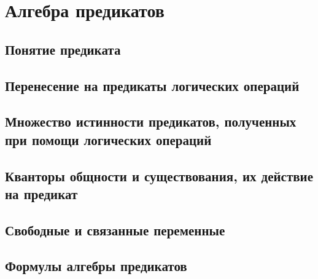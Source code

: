 \section{Алгебра предикатов}
\subsection{Понятие предиката}
\subsection{Перенесение на предикаты логических операций}
\subsection{Множество истинности предикатов, полученных при помощи логических операций}
\subsection{Кванторы общности и существования, их действие на предикат}
\subsection{Свободные и связанные переменные}
\subsection{Формулы алгебры предикатов}